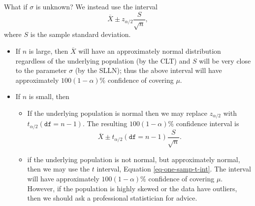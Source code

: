 \documentclass[captions=tableheading]{scrbook}
\begin{document}
\begin{rem}
What if \(\sigma\) is unknown? We instead use the interval
\begin{equation}
\overline{X}\pm z_{\alpha/2}\frac{S}{\sqrt{n}},
\end{equation}
where \(S\) is the sample standard deviation.
\begin{itemize}
\item If \(n\) is large, then \(\overline{X}\) will have an approximately normal distribution regardless of the underlying population (by the CLT) and \(S\) will be very close to the parameter \(\sigma\) (by the SLLN); thus the above interval will have approximately \(100(1-\alpha)\%\) confidence of covering \(\mu\).
\item If \(n\) is small, then
\begin{itemize}
\item If the underlying population is normal then we may replace \(z_{\alpha/2}\) with \(t_{\alpha/2}(\mathtt{df}=n-1)\). The resulting \(100(1-\alpha)\%\) confidence interval is
     \begin{equation}
     \overline{X}\pm t_{\alpha/2}(\mathtt{df}=n-1)\frac{S}{\sqrt{n}}.\label{eq-one-samp-t-int}
     \end{equation}
\item if the underlying population is not normal, but approximately normal, then we may use the \(t\) interval, Equation \ref{eq-one-samp-t-int}. The interval will have approximately \(100(1-\alpha)\%\) confidence of covering \(\mu\). However, if the population is highly skewed or the data have outliers, then we should ask a professional statistician for advice.
\end{itemize}
\end{itemize}

\end{rem}
\end{document}
